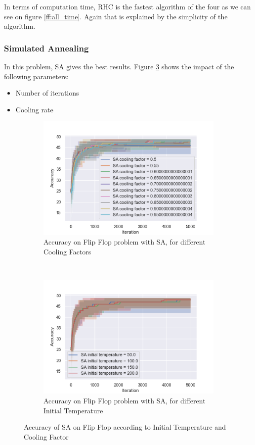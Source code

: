 \documentclass[twocolumn, 10pt]{article}
\begin{document}
				In terms of computation time, RHC is the fastest algorithm of the four as we can see on figure \ref{ff:all_time}. Again that is explained by the simplicity of the algorithm.
			\subsubsection*{Simulated Annealing}
				In this problem, SA gives the best results. Figure \ref{ff:sa} shows the impact of the following parameters:
				\begin{itemize}
					\item Number of iterations
					\item Cooling rate
				\end{itemize}

				\begin{figure}[h]
					\centering
					\begin{subfigure}[t]{\columnwidth}
						\centering
						\includegraphics[width=0.68\linewidth]{../graphics/flip_flop_SA_Iteration_Error_SA_cooling_factor.png}
						\caption{Accuracy on Flip Flop problem with SA, for different Cooling Factors}
						\label{ff:sa_cooling}
					\end{subfigure}
					~
					\begin{subfigure}[t]{\columnwidth}
						\centering
						\includegraphics[width=0.68\linewidth]{../graphics/flip_flop_SA_Iteration_Error_SA_initial_temperature.png}
						\caption{Accuracy on Flip Flop problem with SA, for different Initial Temperature}
						\label{ff:sa_initial_temp}
					\end{subfigure}
					\caption{Accuracy of SA on Flip Flop according to Initial Temperature and Cooling Factor}
					\label{ff:sa}
				\end{figure}
\end{document}
